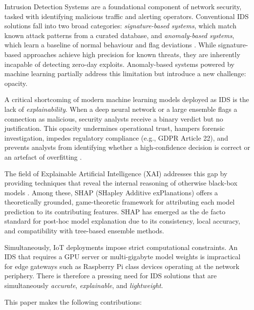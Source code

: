 \documentclass[12pt,a4paper]{article}
\begin{document}
Intrusion Detection Systems are a foundational component of network security, tasked
with identifying malicious traffic and alerting operators. Conventional IDS solutions
fall into two broad categories: \emph{signature-based systems}, which match known
attack patterns from a curated database, and \emph{anomaly-based systems}, which
learn a baseline of normal behaviour and flag deviations
\cite{garcia2009anomaly,liao2013iot}. While signature-based approaches achieve high
precision for known threats, they are inherently incapable of detecting zero-day
exploits. Anomaly-based systems powered by machine learning partially address this
limitation but introduce a new challenge: opacity.

A critical shortcoming of modern machine learning models deployed as IDS is the
lack of \emph{explainability}. When a deep neural network or a large ensemble flags
a connection as malicious, security analysts receive a binary verdict but no
justification. This opacity undermines operational trust, hampers forensic
investigation, impedes regulatory compliance (e.g., GDPR Article 22), and prevents
analysts from identifying whether a high-confidence decision is correct or an artefact
of overfitting \cite{doshi2017towards,gunning2019xai}.

The field of Explainable Artificial Intelligence (XAI) addresses this gap by
providing techniques that reveal the internal reasoning of otherwise black-box
models \cite{molnar2022}. Among these, SHAP (SHapley Additive exPlanations)
\cite{lundberg2017shap} offers a theoretically grounded, game-theoretic framework
for attributing each model prediction to its contributing features. SHAP has emerged
as the de facto standard for post-hoc model explanation due to its consistency,
local accuracy, and compatibility with tree-based ensemble methods.

Simultaneously, IoT deployments impose strict computational constraints. An IDS
that requires a GPU server or multi-gigabyte model weights is impractical for edge
gateways such as Raspberry Pi class devices operating at the network periphery.
There is therefore a pressing need for IDS solutions that are simultaneously
\emph{accurate}, \emph{explainable}, and \emph{lightweight}.

This paper makes the following contributions:
\end{document}
